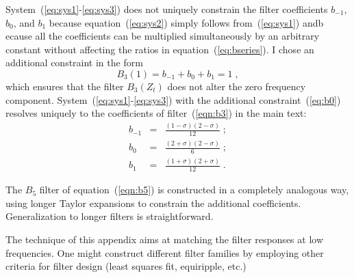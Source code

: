System~(\ref{eq:sys1}-\ref{eq:sys3}) does not uniquely constrain the
filter coefficients $b_{-1}$, $b_0$, and $b_1$ because
equation~(\ref{eq:sys2}) simply follows from~(\ref{eq:sys1}) andb
ecause all the coefficients can be multiplied simultaneously by an
arbitrary constant without affecting the ratios in
equation~(\ref{eq:bseries}). I chose an additional constraint in the 
form
\begin{equation}
  \label{eq:b0}
  B_3(1) = b_{-1} + b_0 + b_1 = 1\;,
\end{equation}
which ensures that the filter $B_3(Z_t)$ does not alter the zero
frequency component. System~(\ref{eq:sys1}-\ref{eq:sys3}) with the
additional constraint~(\ref{eq:b0}) resolves uniquely to
the coefficients of filter~(\ref{eqn:b3}) in the main text:
\begin{eqnarray}
   b_{-1} & = & \frac{(1-\sigma)(2-\sigma)}{12}\;;   
   \label{eq:sol1}
   \\
  b_0 & = & \frac{(2+\sigma)(2-\sigma)}{6}\;; 
  \label{eq:sol2}
  \\
  b_1 & = & \frac{(1+\sigma)(2+\sigma)}{12}\;.
  \label{eq:sol3}
\end{eqnarray}

The $B_5$ filter of equation~(\ref{eqn:b5}) is constructed in a
completely analogous way, using longer Taylor expansions to constrain
the additional coefficients. Generalization to longer filters is
straightforward.

The technique of this appendix aims at matching the filter responses
at low frequencies. One might construct different filter families by
employing other criteria for filter design (least squares fit, 
equiripple, etc.)

%
%

